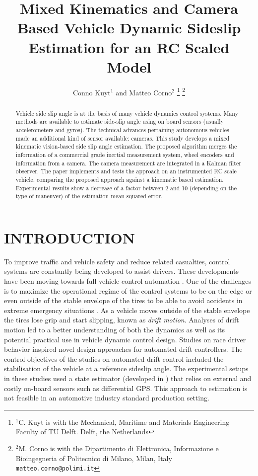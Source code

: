 \documentclass[letterpaper, 10 pt, conference]{ieeeconf}
\title{\LARGE \bf
Mixed Kinematics and Camera Based Vehicle Dynamic Sideslip Estimation for an RC Scaled Model
}
\author{Conno Kuyt$^{1}$ and Matteo Corno$^{2}$%
\thanks{$^{1}$C. Kuyt is with the Mechanical, Maritime and Materials Engineering Faculty of TU Delft. Delft, the Netherlands}%
\thanks{$^{2}$M. Corno is with the Dipartimento di Elettronica, Informazione e Bioingegneria of Politecnico di Milano, Milan, Italy
        {\tt\small matteo.corno@polimi.it}}%
}
\begin{document}
\maketitle
\thispagestyle{empty}
\pagestyle{empty}


\begin{abstract}
Vehicle side slip angle is at the basis of many vehicle dynamics control systems. Many methods are available to estimate side-slip angle using on board sensors (usually accelerometers and gyros). The technical advances pertaining autonomous vehicles made an additional kind of sensor available: cameras. This study develops a mixed kinematic vision-based side slip angle estimation.  The proposed algorithm merges the information of a commercial grade inertial measurement system, wheel encoders and information from a camera. The camera measurement are integrated in a Kalman filter observer. The paper implements and tests the approach on an instrumented RC scale vehicle, comparing the proposed approach against a kinematic based estimation. Experimental results show a decrease of a factor between 2 and 10 (depending on the type of maneuver) of the estimation mean squared error.
\end{abstract}


\section{INTRODUCTION}

To improve traffic and vehicle safety and reduce related casualties, control systems are constantly being developed to assist drivers. These developments have been moving towards full vehicle control automation \cite{ioannou2005automated}. One of the challenges is to maximize the operational regime of the control systems to be on the edge or even outside of the stable envelope of the tires to be able to avoid accidents in extreme emergency situations \cite{maurer2016autonomous}. As a vehicle moves outside of the stable envelope the tires lose grip and start slipping, known as \emph{drift motion}. Analyses of drift motion \cite{abdulrahim2006dynamics, edelmann2009handling} led to a better understanding of both the dynamics as well as its potential practical use in vehicle dynamic control design. Studies on race driver behavior \cite{velenis2005minimum,kritayakirana2012autonomous} inspired novel design approaches for automated drift controllers. The control objectives of the studies on automated drift control \cite{VoserAnalysis2010,hindiyeh2014controller,goh2016simultaneous} included the stabilisation of the vehicle at a reference sideslip angle. The experimental setups in these studies used a state estimator (developed in \cite{ryu2004integrating,hsu2010estimation,beal2011applications}) that relies on external and costly on-board sensors such as differential GPS. This approach to estimation is not feasible in an automotive industry standard production setting. 
\end{document}
